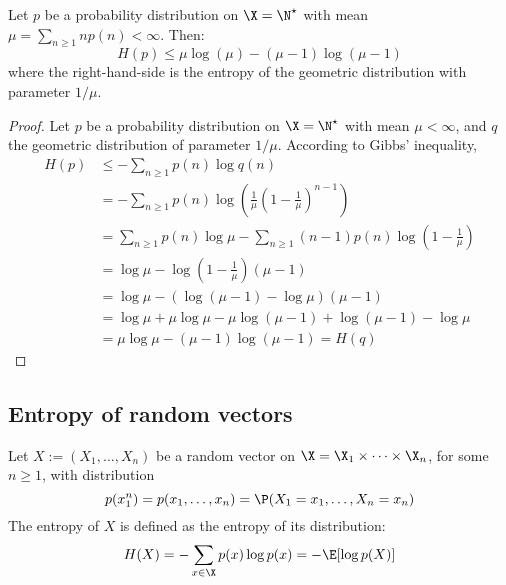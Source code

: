 \documentclass[toc]{../cs-classes/cs-classes}
\begin{document}
\begin{corollary}
    Let $p$ be a probability distribution on $\X=\N^\star$ with mean $\mu=\sum_{n\geq 1} np(n) < \infty$. Then:
    \begin{equation*}
        H(p)\leq\mu\log(\mu)-(\mu-1)\log(\mu-1)
    \end{equation*}
    where the right-hand-side is the entropy of the geometric distribution with parameter $1/\mu$.
\end{corollary}

\begin{proof}
    Let $p$ be a probability distribution on $\X=\N^\star$ with mean $\mu<\infty$, and $q$ the geometric distribution of parameter $1/\mu$. According to Gibbs' inequality,
    \begin{equation*}
        \begin{aligned}
            H(p)&\leq-\sum_{n\geq 1}p(n)\log q(n) \\
            &=-\sum_{n\geq 1}p(n)\log\left(\frac{1}{\mu}\left(1-\frac{1}{\mu}\right)^{n-1}\right)\\
            &=\sum_{n\geq 1}p(n)\log \mu - \sum_{n\geq 1}(n-1) p(n)\log\left(1-\frac{1}{\mu}\right) \\
            &=\log\mu - \log\left(1-\frac{1}{\mu}\right)\left(\mu - 1\right)\\
            &=\log\mu - \left(\log(\mu-1)-\log\mu\right)\left(\mu - 1\right)\\
            &=\log\mu + \mu\log\mu - \mu\log(\mu-1) + \log(\mu-1) - \log\mu\\
            &=\mu\log\mu - (\mu-1)\log(\mu-1) = H(q)
        \end{aligned}
    \end{equation*}
\end{proof}

\subsection{Entropy of random vectors}
\begin{definition}
    Let $X:=(X_1, \dots, X_n)$ be a random vector on $\X=\X_1\times \dots \times \X_n$, for some $n\geq 1$, with distribution
    \begin{equation*}
        p(x_1^n)=p(x_1, \dots, x_n) = \P(X_1=x_1, \dots, X_n=x_n)
    \end{equation*}
    The entropy of $X$ is defined as the entropy of its distribution:
    \begin{equation}
        H(X)=-\sum_{x\in \X}p(x)\log p(x) = -\E[\log p(X)]
    \end{equation}
\end{definition}
\end{document}
